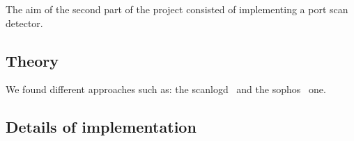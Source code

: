 The aim of the second part of the project consisted of implementing
a port scan detector. 

\subsection{Theory}
We found different approaches such as: the scanlogd~\cite{scanlogd} and the sophos~\cite{sophos} one.

\subsection{Details of implementation} 
